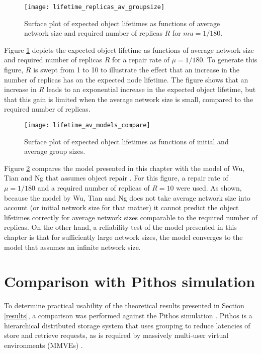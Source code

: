 \begin{figure}[htbp]
 \centering
 \texttt{[image: lifetime\_replicas\_av\_groupsize]}
 \caption{Surface plot of expected object lifetimes as functions of average network size and required number of replicas $R$ for $mu = 1/180$.}
 \label{fig_lifetime_average_vs_replicas}
\end{figure}
%
Figure \ref{fig_lifetime_average_vs_replicas} depicts the expected object lifetime as functions of average network size and required number of replicas $R$ for a repair rate of $\mu = 1/180$. To generate this figure, $R$ is swept from 1 to 10 to illustrate the effect that an increase in the number of replicas has on the expected node lifetime. The figure shows that an increase in $R$ leads to an exponential increase in the expected object lifetime, but that this gain is limited when the average network size is small, compared to the required number of replicas.

\begin{figure}[htbp]
 \centering
 \texttt{[image: lifetime\_av\_models\_compare]}
 \caption{Surface plot of expected object lifetimes as functions of initial and average group sizes.}
 \label{fig_lifetime_vs_other_model}
\end{figure}

Figure \ref{fig_lifetime_vs_other_model} compares the model presented in this chapter with the model of Wu, Tian and Ng that assumes object repair \cite{replication_article}. For this figure, a repair rate of $\mu = 1/180$ and a required number of replicas of $R = 10$ were used. As shown, because the model by Wu, Tian and Ng does not take average network size into account (or initial network size for that matter) it cannot predict the object lifetimes correctly for average network sizes comparable to the required number of replicas. On the other hand, a reliability test of the model presented in this chapter is that for sufficiently large network sizes, the model converges to the model that assumes an infinite network size.

\section{Comparison with Pithos simulation}
\label{simulation}

To determine practical usability of the theoretical results presented in Section \ref{results}, a comparison was performed against the Pithos simulation \cite{Pithos_mmve_2011}. Pithos is a hierarchical distributed storage system that uses grouping to reduce latencies of store and retrieve requests, as is required by massively multi-user virtual environments (MMVEs) \cite{gilmore_p2p_mmog_state_persistency}.

